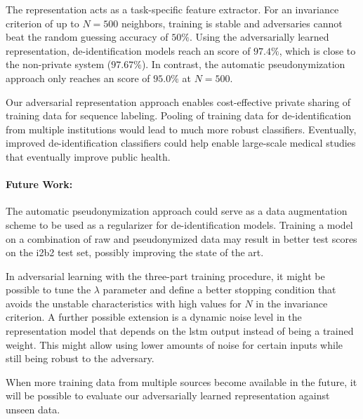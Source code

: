 %
The representation acts as a task-specific feature extractor.
%
For an invariance criterion of up to $N=500$ neighbors, training is stable and adversaries cannot beat the random guessing accuracy of $50\%$.
%
Using the adversarially learned representation, de-identification models reach an \fone score of $97.4\%$, which is close to the non-private system (\(97.67\%\)).
In contrast, the automatic pseudonymization approach only reaches an \fone score of \(95.0\%\) at \(N = 500\).

%
Our adversarial representation approach enables cost-effective private sharing of training data for sequence labeling. Pooling of training data for de-identification from multiple institutions would lead to much more robust classifiers.
%
Eventually, improved de-identification classifiers could help enable large-scale medical studies that eventually improve public health.

%
\paragraph{Future Work:} The automatic pseudonymization approach could serve as a data augmentation scheme to be used as a regularizer for de-identification models.
%
Training a model on a combination of raw and pseudonymized data may result in better test scores on the i2b2 test set, possibly improving the state of the art.


%
In adversarial learning with the three-part training procedure, it might be possible to tune the $\lambda$ parameter and define a better stopping condition that avoids the unstable characteristics with high values for $N$ in the invariance criterion.
%
A further possible extension is a dynamic noise level in the representation model that depends on the \ac{lstm} output instead of being a trained weight.
%
This might allow using lower amounts of noise for certain inputs while still being robust to the adversary.

%
When more training data from multiple sources become available in the future, it will be possible to evaluate our adversarially learned representation against unseen data.

